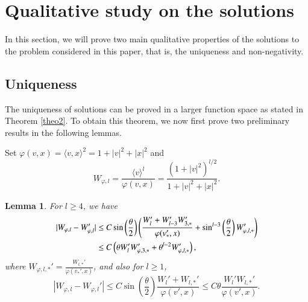 \documentclass{amsart}[12pt, article]
\newtheorem{lemm}[theo]{Lemma}
\begin{document}
\section{Qualitative study on the solutions}\label{section5}
\smallbreak

In this section, we will prove two main qualitative properties of the
solutions to the problem considered in this paper, that is, the uniqueness
and non-negativity.
\subsection{Uniqueness}\label{section5.1}
\setcounter{equation}{0} \smallbreak
The uniqueness of solutions can be proved in a larger function space as stated in
Theorem \ref{theo2}. To obtain this theorem, we now first prove
 two preliminary results in  the following   lemmas.

Set $\varphi(v,x) = {{\langle}} v, x {{\rangle}}^2 = 1+|v|^2 +|x|^2$ and
\[
W_{\varphi,l} = \frac{{{\langle}} v {{\rangle}}^l}{\varphi(v,x)}= \frac{(1+|v|^2)^{l/2}}{1+|v|^2 + |x|^2} .
\]

\begin{lemm}\label{weight} For $ l \geq 4$, we have
\begin{align}\label{diff-sing}
|W_{\varphi,l} - W_{\varphi,l} '| &\leq C
\sin \left(\frac{\theta}{2} \right)
\left( \frac{W_l' + W_{l-3}'  W_{3,*}'}{\varphi(v_*',x)}
+ \sin^{l-3} \left(\frac{\theta}{2} \right)
W_{\varphi,l, *}'\right)  \notag \\
&\leq C \left(\theta W_l' W_{\varphi, 3,*}'   + \theta^{l-2} W_{\varphi,l, *}' \right ),
\end{align}
where $W_{\varphi,l,*}' =\displaystyle  \frac{W_{l,*}'}{\varphi(v_*',x)} $, and also for $l\ge 1$,
\begin{equation}\label{diff-reg}
|W_{\varphi,l} - W_{\varphi,l} '| \leq C
\sin \left(\frac{\theta}{2} \right)
 \frac{W_l' +  W_{l,*}'}{\varphi(v',x)} \leq C \theta \frac{W_l'  W_{l,*}'}{\varphi(v',x)}.
\end{equation}
\end{lemm}
\end{document}
